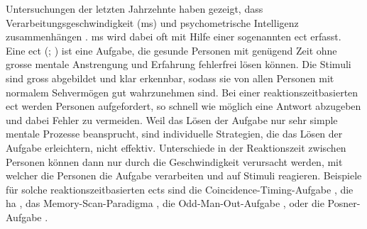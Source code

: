 \documentclass[11pt, twoside, a4paper]{book}		%
\begin{document}
Untersuchungen der letzten Jahrzehnte  haben gezeigt, dass Verarbeitungsgeschwindigkeit (\gls{ms}) und psychometrische Intelligenz zusammenhängen \citep[für Übersichtsarbeiten siehe][]{Deary2000a, Jensen2006, Sheppard2008}. \gls{ms} wird dabei oft mit Hilfe einer sogenannten \gls{ect} erfasst. 
Eine \gls{ect} (\citealp[S. 11]{Carroll1993}; \citealp[S. 203--209]{Jensen1998b}) ist eine Aufgabe, die gesunde Personen mit genügend Zeit ohne grosse mentale Anstrengung und Erfahrung fehlerfrei lösen können. Die Stimuli sind gross abgebildet und klar erkennbar, sodass sie von allen Personen mit normalem Sehvermögen gut wahrzunehmen sind. 
Bei einer reaktionszeitbasierten \gls{ect} werden Personen aufgefordert, so schnell wie möglich eine Antwort abzugeben und dabei Fehler zu vermeiden. 
Weil das Lösen der Aufgabe nur sehr simple mentale Prozesse beansprucht, sind individuelle Strategien, die das Lösen der Aufgabe erleichtern, nicht effektiv. Unterschiede in der Reaktionszeit zwischen Personen können dann nur durch die Geschwindigkeit verursacht werden, mit welcher die Personen die Aufgabe verarbeiten und auf Stimuli reagieren.
Beispiele für solche reaktionszeitbasierten \glspl{ect} sind
die Coincidence-Timing-Aufgabe \citep[bei welcher eine zeitliches Zusammentreffen von zwei Stimuli so rasch als möglich erkannt werden muss;][]{Smith1987a}, 
die \gls{ha} \citep[zur Erfassung einfacher Reaktionszeit und der Reaktionszeit für eine Mehrfachauswahl;][]{Hick1952}, 
das Memory-Scan-Paradigma \citep[zur Erfassung der benötigten Zeit für einen Zugriff auf das Kurzzeitgedächtnis;][]{Sternberg1966, Sternberg1969},
die Odd-Man-Out-Aufgabe \citep[zur Erfassung der Reaktionszeit für eine Mehrfachauswahl;][]{Frearson1986}, 
oder die Posner-Aufgabe \citep[zur Erfassung der benötigten Zeit für einen Zugriff auf das Langzeitgedächtnis;][]{Posner1969}.

\end{document}
